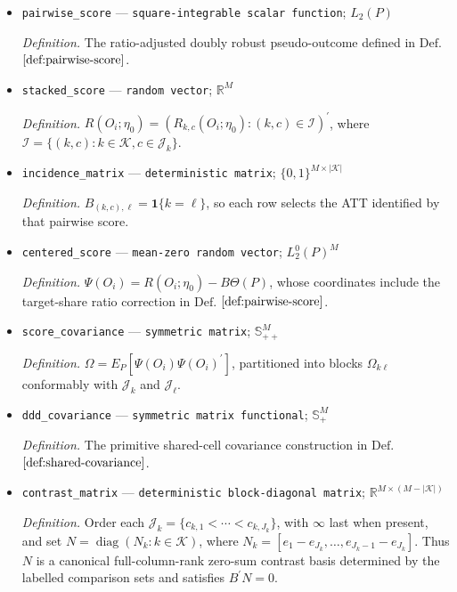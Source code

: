 \documentclass{article}
\begin{document}
\begin{itemize}
  \par\smallskip\noindent\emph{Definition.} For \(k=(g,t)\in\mathcal K\), where \(2\le g\le t\le T\), \(c\in\mathcal J_k\), and \(a\in\{g,c\}\), \(L_{k,c}^{a,s}(x)=p_{g,1}(x)\sigma_{a,s}^{g,c}/\{\pi_{g,1}p_{a,s}(x)\}\).
  \item \texttt{pairwise\_\allowbreak{}score} --- \texttt{square-\allowbreak{}integrable scalar function}; \(L_2(P)\)
  \par\smallskip\noindent\emph{Definition.} The ratio-adjusted doubly robust pseudo-outcome defined in \(\mathrm{Def.}\) \(\ref{def:pairwise-score}\).
  \item \texttt{stacked\_\allowbreak{}score} --- \texttt{random vector}; \(\mathbb R^M\)
  \par\smallskip\noindent\emph{Definition.} \(R(O_i;\eta_0)=(R_{k,c}(O_i;\eta_0):(k,c)\in\mathcal I)^{\prime}\), where \(\mathcal I=\{(k,c):k\in\mathcal K,c\in\mathcal J_k\}\).
  \item \texttt{incidence\_\allowbreak{}matrix} --- \texttt{deterministic matrix}; \(\{0,1\}^{M\times|\mathcal K|}\)
  \par\smallskip\noindent\emph{Definition.} \(B_{(k,c),\ell}=\mathbf 1\{k=\ell\}\), so each row selects the ATT identified by that pairwise score.
  \item \texttt{centered\_\allowbreak{}score} --- \texttt{mean-\allowbreak{}zero random vector}; \(L_2^0(P)^M\)
  \par\smallskip\noindent\emph{Definition.} \(\Psi(O_i)=R(O_i;\eta_0)-B\Theta(P)\), whose coordinates include the target-share ratio correction in \(\mathrm{Def.}\) \(\ref{def:pairwise-score}\).
  \item \texttt{score\_\allowbreak{}covariance} --- \texttt{symmetric matrix}; \(\mathbb S_{++}^M\)
  \par\smallskip\noindent\emph{Definition.} \(\Omega=E_P[\Psi(O_i)\Psi(O_i)^{\prime}]\), partitioned into blocks \(\Omega_{k\ell}\) conformably with \(\mathcal J_k\) and \(\mathcal J_\ell\).
  \item \texttt{ddd\_\allowbreak{}covariance} --- \texttt{symmetric matrix functional}; \(\mathbb S_+^M\)
  \par\smallskip\noindent\emph{Definition.} The primitive shared-cell covariance construction in \(\mathrm{Def.}\) \(\ref{def:shared-covariance}\).
  \item \texttt{contrast\_\allowbreak{}matrix} --- \texttt{deterministic block-\allowbreak{}diagonal matrix}; \(\mathbb R^{M\times(M-|\mathcal K|)}\)
  \par\smallskip\noindent\emph{Definition.} Order each \(\mathcal J_k=\{c_{k,1}<\cdots<c_{k,J_k}\}\), with \(\infty\) last when present, and set \(N=\operatorname{diag}(N_k:k\in\mathcal K)\), where \(N_k=[e_1-e_{J_k},\ldots,e_{J_k-1}-e_{J_k}]\). Thus \(N\) is a canonical full-column-rank zero-sum contrast basis determined by the labelled comparison sets and satisfies \(B^{\prime}N=0\).

\end{itemize}
\end{document}

